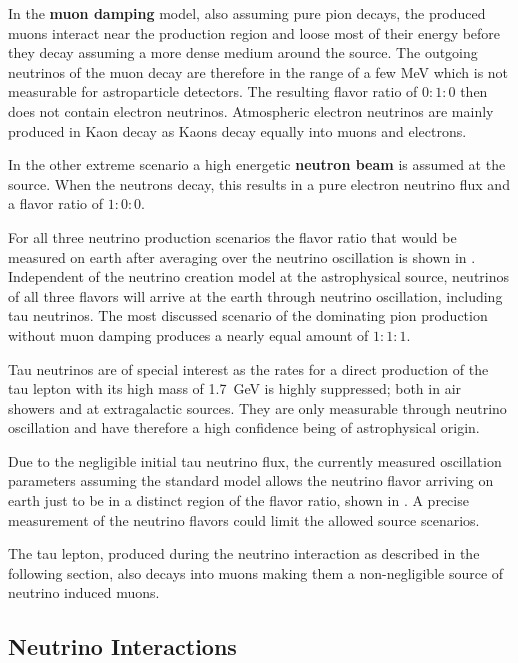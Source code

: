 In the \textbf{muon damping} model, also assuming pure pion decays, the produced muons interact near the production region and loose most of their energy before they decay assuming a more dense medium around the source.
The outgoing neutrinos of the muon decay are therefore in the range of a few MeV which is not measurable for astroparticle detectors.
The resulting flavor ratio of $0:1:0$ then does not contain electron neutrinos.
Atmospheric electron neutrinos are mainly produced in Kaon decay as Kaons decay equally into muons and electrons.

In the other extreme scenario a high energetic \textbf{neutron beam} is assumed at the source.
When the neutrons decay, this results in a pure electron neutrino flux and a flavor ratio of $1:0:0$.

For all three neutrino production scenarios the flavor ratio that would be measured on earth after averaging over the neutrino oscillation is shown in .
Independent of the neutrino creation model at the astrophysical source, neutrinos of all three flavors will arrive at the earth through neutrino oscillation, including tau neutrinos.
The most discussed scenario of the dominating pion production without muon damping produces a nearly equal amount of $1:1:1$.

Tau neutrinos are of special interest as the rates for a direct production of the tau lepton with its high mass of \SI{1.7}{GeV} is highly suppressed; both in air showers and at extragalactic sources.
They are only measurable through neutrino oscillation and have therefore a high confidence being of astrophysical origin.

Due to the negligible initial tau neutrino flux, the currently measured oscillation parameters assuming the standard model allows the neutrino flavor arriving on earth just to be in a distinct region of the flavor ratio, shown in .
A precise measurement of the neutrino flavors could limit the allowed source scenarios.

The tau lepton, produced during the neutrino interaction as described in the following section, also decays into muons making them a non-negligible source of neutrino induced muons.

\subsection{Neutrino Interactions}

